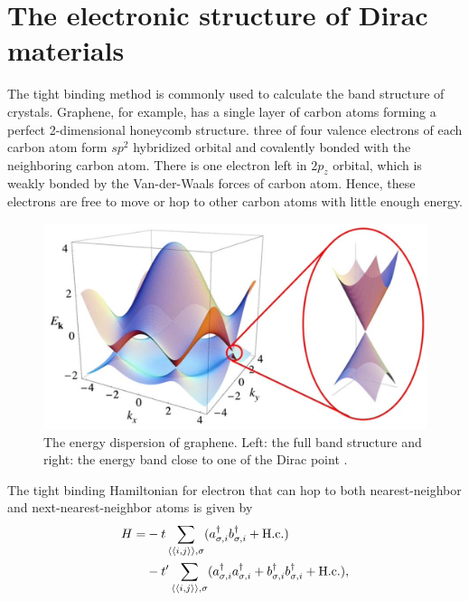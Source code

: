 \section{The electronic structure of Dirac materials}
     The tight binding method is commonly used to calculate the band structure of crystals.
     Graphene, for example, has a single layer of carbon atoms forming a perfect 2-dimensional honeycomb structure.
     three of four valence electrons of each carbon atom form $sp^2$ hybridized orbital and covalently bonded with the neighboring carbon atom.
     There is one electron left in $2p_z$ orbital, which is weakly bonded by the Van-der-Waals forces of carbon atom.
     Hence, these electrons are free to move or hop to other carbon atoms with little enough energy.\\
    \begin{figure}[H]
        \centering
        \includegraphics[width = 0.8\linewidth]{fig/Chap 2/band structure of graphene.png}
        \caption{The energy dispersion of graphene. 
                    Left: the full band structure and right: the energy band close to one of the Dirac point \cite{CastroNeto2009}.}
        \label{2fig:band structure of graphene}
    \end{figure}
     The tight binding Hamiltonian for electron that can hop to both nearest-neighbor and next-nearest-neighbor atoms is given by
     \begin{equation} \label{2eq:tight binding Hamiltonian}
         \begin{aligned}
             H = &-t \sum_{\braket{\braket{i,j}},\sigma} (a_{\sigma, i}^{\dagger} b_{\sigma,i}^{\dagger}+ \mathrm{H.c.})\\
                    &-t' \sum_{\braket{\braket{i,j}},\sigma} (a_{\sigma, i}^{\dagger} a_{\sigma,i}^{\dagger}+ b_{\sigma, i}^{\dagger} b_{\sigma,i}^{\dagger} + \mathrm{H.c.}),\\
         \end{aligned}
     \end{equation}

